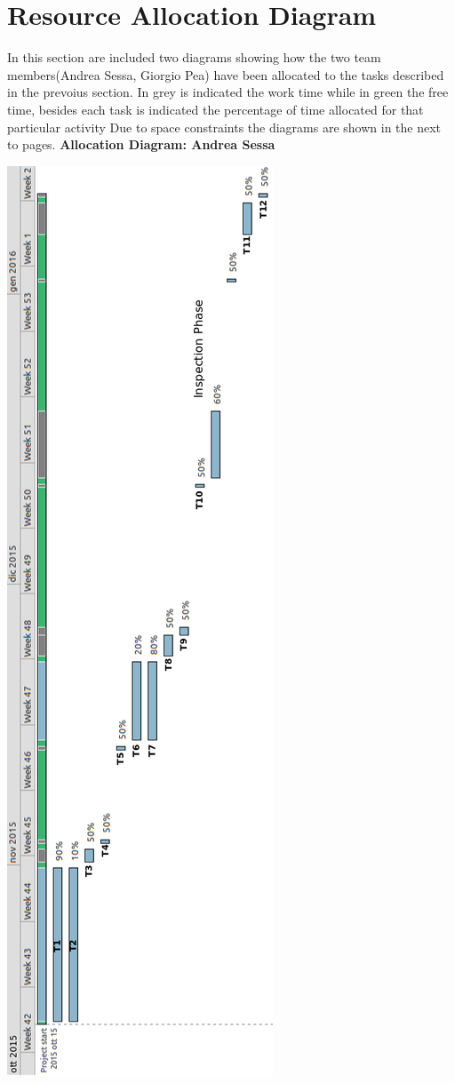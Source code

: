 \documentclass[11pt,titlepage]{article} %
\begin{document}
\section{Resource Allocation Diagram}
  In this section are included two diagrams showing how the two team members(Andrea Sessa, Giorgio Pea) have been allocated to the tasks
  described in the prevoius section.\newline
  In grey is indicated the work time while in green the free time, besides each task is indicated the percentage of time allocated for that 
  particular activity\newline
  Due to space constraints the diagrams are shown in the next to pages.\newline
  \newpage
  \textbf{Allocation Diagram: Andrea Sessa}\newline
  \begin{center}
       \includegraphics[scale=0.4]{res1.png}
  \end{center}
\end{document}
